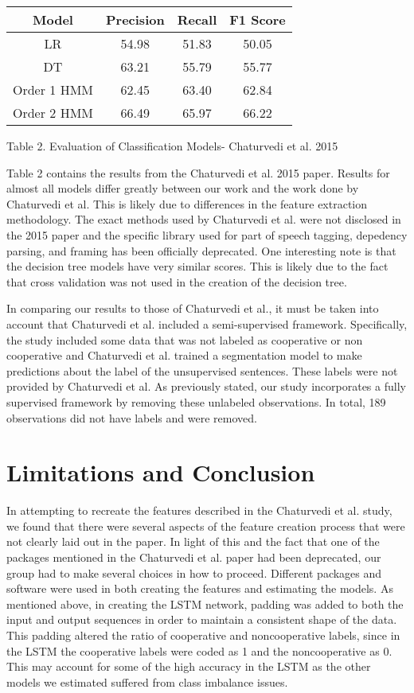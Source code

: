 \documentclass[11pt,a4paper]{article}
\begin{document}
\begin{center}
 \begin{tabular}{||c c c c||} 
 \hline
 Model & Precision & Recall & F1 Score \\ [0.5ex] 
 \hline\hline
 LR & 54.98 & 51.83 & 50.05 \\ 
 \hline
 DT & 63.21 & 55.79 & 55.77 \\
 \hline
 Order 1 HMM & 62.45 & 63.40 & 62.84 \\
  \hline
 Order 2 HMM & 66.49 & 65.97 & 66.22 \\
 \hline
\end{tabular}
\end{center}
\caption{Table 2. Evaluation of Classification Models- Chaturvedi et al. 2015}
\label{table:2}


Table 2 contains the results from the Chaturvedi et al. 2015 paper. Results for almost all models differ greatly between our work and the work done by Chaturvedi et al. This is likely due to differences in the feature extraction methodology. The exact methods used by Chaturvedi et al. were not disclosed in the 2015 paper and the specific library used for part of speech tagging, depedency parsing, and framing has been officially deprecated. One interesting note is that the decision tree models have very similar scores. This is likely due to the fact that cross validation was not used in the creation of the decision tree. 

In comparing our results to those of Chaturvedi et al., it must be taken into account that Chaturvedi et al. included a semi-supervised framework. Specifically, the study included some data that was not labeled as cooperative or non cooperative and Chaturvedi et al. trained a segmentation model to make predictions about the label of the unsupervised sentences. These labels were not provided by Chaturvedi et al. As previously stated, our study incorporates a fully supervised framework by removing these unlabeled observations. In total, 189 observations did not have labels and were removed.



\section{Limitations and Conclusion}

In attempting to recreate the features described in the Chaturvedi et al. study, we found that there were several aspects of the feature creation process that were not clearly laid out in the paper. In light of this and the fact that one of the packages mentioned in the Chaturvedi et al. paper had been deprecated, our group had to make several choices in how to proceed. Different packages and software were used in both creating the features and estimating the models.
As mentioned above, in creating the LSTM network, padding was added to both the input and output sequences in order to maintain a consistent shape of the data. This padding altered the ratio of cooperative and noncooperative labels, since in the LSTM the cooperative labels were coded as 1 and the noncooperative as 0. This may account for some of the high accuracy in the LSTM as the other models we estimated suffered from class imbalance issues.
\end{document}
